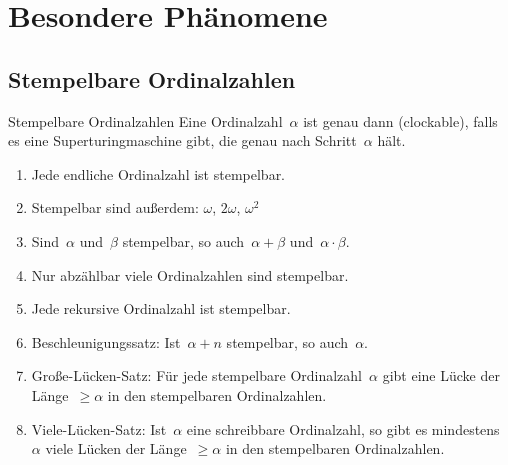 \documentclass[12pt,compress,ngerman,utf8,t]{beamer}
\newcommand{\hil}[1]{{\usebeamercolor[fg]{item}{\textbf{#1}}}}
\begin{document}
\section{Besondere Phänomene}

\subsection{Stempelbare Ordinalzahlen}

\begin{frame}{Stempelbare Ordinalzahlen}
  Eine Ordinalzahl~$\alpha$ ist genau dann \hil{stempelbar} (clockable),
  falls es eine Superturingmaschine gibt, die genau nach Schritt~$\alpha$ hält.

  \begin{enumerate}
    \item Jede endliche Ordinalzahl ist stempelbar.
    \item Stempelbar sind außerdem: $\omega$, $2\omega$, $\omega^2$
    \item Sind~$\alpha$ und~$\beta$ stempelbar, so auch~$\alpha+\beta$
    und~$\alpha \cdot \beta$.
    \item Nur abzählbar viele Ordinalzahlen sind stempelbar.
    \pause
    \item Jede rekursive Ordinalzahl ist stempelbar.
    \item Beschleunigungssatz: Ist~$\alpha + n$ stempelbar, so auch~$\alpha$.
    \pause
    \item Große-Lücken-Satz: Für jede stempelbare Ordinalzahl~$\alpha$
    gibt eine Lücke der Länge~$\geq \alpha$ in den stempelbaren Ordinalzahlen.
    \item Viele-Lücken-Satz: Ist~$\alpha$ eine schreibbare Ordinalzahl,
    so gibt es mindestens~$\alpha$ viele Lücken der Länge~$\geq \alpha$ in den
    stempelbaren Ordinalzahlen.
  \end{enumerate}
\end{frame}
\end{document}
